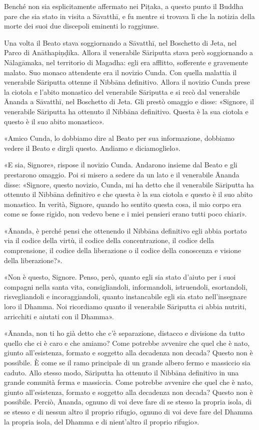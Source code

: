 

 Benché non sia esplicitamente affermato nei Piṭaka, a
questo punto il Buddha pare che sia stato in visita a Sāvatthī, e fu
mentre si trovava lì che la notizia della morte dei suoi due discepoli
eminenti lo raggiunse.


 Una volta il Beato stava soggiornando a Sāvatthī, nel
Boschetto di Jeta, nel Parco di Anāthapiṇḍika. Allora il venerabile
Sāriputta stava però soggiornando a Nālagāmaka, nel territorio di
Magadha: egli era afflitto, sofferente e gravemente malato. Suo monaco
attendente era il novizio Cunda. Con quella malattia il venerabile
Sāriputta ottenne il Nibbāna definitivo. Allora il novizio Cunda prese
la ciotola e l’abito monastico del venerabile Sāriputta e si recò dal
venerabile Ānanda a Sāvatthī, nel Boschetto di Jeta. Gli prestò omaggio
e disse: «Signore, il venerabile Sāriputta ha ottenuto il Nibbāna
definitivo. Questa è la sua ciotola e questo è il suo abito monastico».


«Amico Cunda, lo dobbiamo dire al Beato per sua informazione, dobbiamo
vedere il Beato e dirgli questo. Andiamo e diciamoglielo».


«E sia, Signore», rispose il novizio Cunda. Andarono insieme dal Beato e
gli prestarono omaggio. Poi si misero a sedere da un lato e il
venerabile Ānanda disse: «Signore, questo novizio, Cunda, mi ha detto
che il venerabile Sāriputta ha ottenuto il Nibbāna definitivo e che
questa è la sua ciotola e questo è il suo abito monastico. In verità,
Signore, quando ho sentito questa cosa, il mio corpo era come se fosse
rigido, non vedevo bene e i miei pensieri erano tutti poco chiari».


«Ānanda, è perché pensi che ottenendo il Nibbāna definitivo egli abbia
portato via il codice della virtù, il codice della concentrazione, il
codice della comprensione, il codice della liberazione o il codice della
conoscenza e visione della liberazione?».


«Non è questo, Signore. Penso, però, quanto egli sia stato d’aiuto per i
suoi compagni nella santa vita, consigliandoli, informandoli,
istruendoli, esortandoli, risvegliandoli e incoraggiandoli, quanto
instancabile egli sia stato nell’insegnare loro il Dhamma. Noi
ricordiamo quanto il venerabile Sāriputta ci abbia nutriti, arricchiti e
aiutati con il Dhamma».


«Ānanda, non ti ho già detto che c’è separazione, distacco e divisione
da tutto quello che ci è caro e che amiamo? Come potrebbe avvenire che
quel che è nato, giunto all’esistenza, formato e soggetto alla decadenza
non decada? Questo non è possibile. È come se il ramo principale di un
grande albero fermo e massiccio sia caduto. Allo stesso modo, Sāriputta
ha ottenuto il Nibbāna definitivo in una grande comunità ferma e
massiccia. Come potrebbe avvenire che quel che è nato, giunto
all’esistenza, formato e soggetto alla decadenza non decada? Questo non
è possibile. Perciò, Ānanda, ognuno di voi deve fare di se stesso la
propria isola, di se stesso e di nessun altro il proprio rifugio, ognuno
di voi deve fare del Dhamma la propria isola, del Dhamma e di
nient’altro il proprio rifugio».


